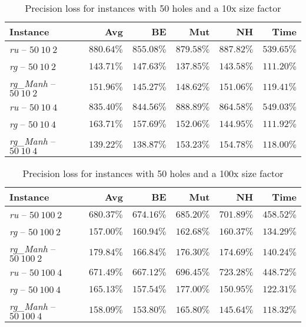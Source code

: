 \begin{table}[H]
  \centering
  \begin{tabular}{|l|r|r|r|r|r|}
    \hline
    \textbf{Instance} & \textbf{Avg} & \textbf{BE} &
    \textbf{Mut} & \textbf{NH} & \textbf{Time} \\
    \hline
    \hline
    \textit{ru} -- $50\ 10\ 2$ &
    $880.64\%$ & $855.08\%$ & $879.58\%$ & $887.82\%$ & $539.65\%$ \\
    \hline
    \textit{rg} -- $50\ 10\ 2$ &
    $143.71\%$ & $147.63\%$ & $137.85\%$ & $143.58\%$ & $111.20\%$ \\
    \hline
    \textit{rg\_Manh} -- $50\ 10\ 2$ &
    $151.96\%$ & $145.27\%$ & $148.62\%$ & $151.06\%$ & $119.41\%$ \\
    \hline
    \textit{ru} -- $50\ 10\ 4$ &
    $835.40\%$ & $844.56\%$ & $888.89\%$ & $864.58\%$ & $549.03\%$ \\
    \hline
    \textit{rg} -- $50\ 10\ 4$ &
    $163.71\%$ & $157.69\%$ & $152.06\%$ & $144.95\%$ & $111.92\%$ \\
    \hline
    \textit{rg\_Manh} -- $50\ 10\ 4$ &
    $139.22\%$ & $138.87\%$ & $153.23\%$ & $154.78\%$ & $118.00\%$ \\
    \hline
  \end{tabular}
  \caption{Precision loss for instances with 50 holes and a 10x size factor}
  \label{tab:precision-50-10}
\end{table}

\begin{table}[H]
  \centering
  \begin{tabular}{|l|r|r|r|r|r|}
    \hline
    \textbf{Instance} & \textbf{Avg} & \textbf{BE} &
    \textbf{Mut} & \textbf{NH} & \textbf{Time} \\
    \hline
    \hline
    \textit{ru} -- $50\ 100\ 2$ &
    $680.37\%$ & $674.16\%$ & $685.20\%$ & $701.89\%$ & $458.52\%$ \\
    \hline
    \textit{rg} -- $50\ 100\ 2$ &
    $157.00\%$ & $160.94\%$ & $162.68\%$ & $160.37\%$ & $134.29\%$ \\
    \hline
    \textit{rg\_Manh} -- $50\ 100\ 2$ &
    $179.84\%$ & $166.84\%$ & $176.30\%$ & $174.69\%$ & $140.24\%$ \\
    \hline
    \textit{ru} -- $50\ 100\ 4$ &
    $671.49\%$ & $667.12\%$ & $696.45\%$ & $723.28\%$ & $448.72\%$ \\
    \hline
    \textit{rg} -- $50\ 100\ 4$ &
    $165.13\%$ & $157.54\%$ & $177.00\%$ & $150.95\%$ & $122.31\%$ \\
    \hline
    \textit{rg\_Manh} -- $50\ 100\ 4$ &
    $158.09\%$ & $153.80\%$ & $165.80\%$ & $145.64\%$ & $118.32\%$ \\
    \hline
  \end{tabular}
  \caption{Precision loss for instances with 50 holes and a 100x size factor}
  \label{tab:precision-50-100}
\end{table}

